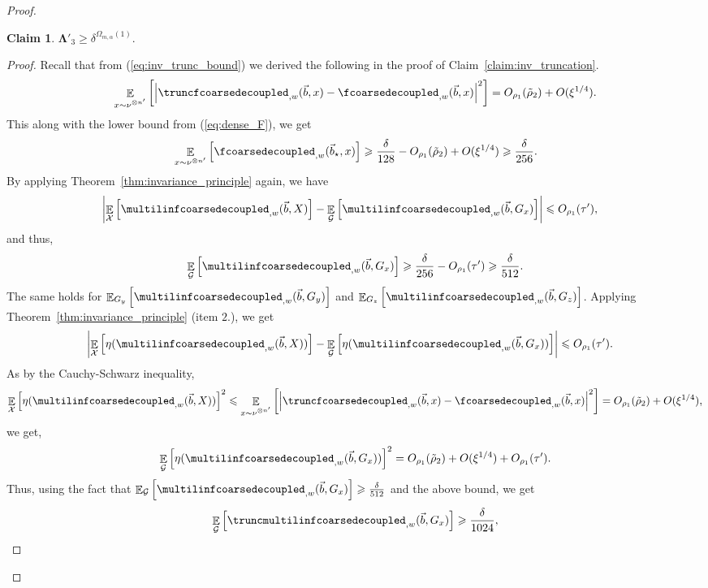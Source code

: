 \documentclass[11pt]{article}
\newtheorem{claim}[thm]{Claim}
\newcommand\card[1]{\left| {#1} \right|}
\newcommand\Expect[2]{{\mathop{\mathbb{E}}_{#1}\left[ {#2} \right]}}
\renewcommand\geq{\geqslant}
\renewcommand\leq{\leqslant}
\newcommand{\V}[1]{{#1}}
\begin{document}
\begin{proof}
   \begin{claim}\label{claim:inv_gaussian_lb} $\mathbf{\Lambda}'_3 \geq \delta^{\Omega_{m,\alpha}(1)}.$
   \end{claim}
   \begin{proof}
   Recall that from (\ref{eq:inv_trunc_bound}) we derived the following in the proof of Claim~\ref{claim:inv_truncation}.
       $$\Expect{\substack{\V x\sim \nu^{\otimes n'}}}{\card{\truncfcoarsedecoupled_{,\V w}(\vec{b},\V x) - \fcoarsedecoupled_{,\V w}(\vec{b},\V x) }^2} = O_{\rho_1}(\tilde{\rho}_2) + O(\xi^{1/4}).$$
       This along with the lower bound from (\ref{eq:dense_F}), we get
       $$\Expect{\V x\sim \nu^{\otimes n'}}{\fcoarsedecoupled_{,\V w}(\vec{b}_\star,\V x)  } \geq \frac{\delta}{128} -  O_{\rho_1}(\tilde{\rho}_2) + O(\xi^{1/4})\geq \frac{\delta}{256}.$$
 By applying Theorem~\ref{thm:invariance_principle} again, we have 
\begin{align*}
\card{\Expect{\mathcal{X}}{\multilinfcoarsedecoupled_{,\V w}(\vec{b}, X)} - \Expect{\mathcal{G}}{\multilinfcoarsedecoupled_{,\V w}(\vec{b},\V G_x)}} &\leq O_{\rho_1}(\tau'),
\end{align*}
and thus,
\begin{align*}
\Expect{\mathcal{G}}{\multilinfcoarsedecoupled_{,\V w}(\vec{b},\V G_x)}\geq \frac{\delta}{256} - O_{\rho_1}(\tau')\geq \frac{\delta}{512}.
\end{align*}
The same holds for $\Expect{G_y}{\multilinfcoarsedecoupled_{,\V w}(\vec{b},  \V G_y)}$ and $\Expect{G_z}{\multilinfcoarsedecoupled_{,\V w}(\vec{b}, \V G_z)}$. Applying Theorem~\ref{thm:invariance_principle} (item $2$.), we get
\begin{align*}
\card{\Expect{\mathcal{X}}{\eta(\multilinfcoarsedecoupled_{,\V w}(\vec{b}, X))} - \Expect{\mathcal{G}}{\eta(\multilinfcoarsedecoupled_{,\V w}(\vec{b},\V G_x))}} &\leq O_{\rho_1}(\tau').
\end{align*}
As by the Cauchy-Schwarz inequality,
$$\Expect{\mathcal{X}}{\eta(\multilinfcoarsedecoupled_{,\V w}(\vec{b}, X))}^2 \leq \Expect{\substack{\V x\sim \nu^{\otimes n'}}}{\card{\truncfcoarsedecoupled_{,\V w}(\vec{b},\V x) - \fcoarsedecoupled_{,\V w}(\vec{b},\V x) }^2} = O_{\rho_1}(\tilde{\rho}_2) + O(\xi^{1/4}),$$
we get,
\begin{equation}\label{eq:trunc_gauss_small}\Expect{\mathcal{G}}{\eta(\multilinfcoarsedecoupled_{,\V w}(\vec{b},\V G_x))}^2 = O_{\rho_1}(\tilde{\rho}_2) + O(\xi^{1/4}) + O_{\rho_1}(\tau').
\end{equation}
Thus, using the fact that $\Expect{\mathcal{G}}{\multilinfcoarsedecoupled_{,\V w}(\vec{b},\V G_x)}\geq  \frac{\delta}{512}$ and the above bound, we get
\begin{align*}
\Expect{\mathcal{G}}{\truncmultilinfcoarsedecoupled_{,\V w}(\vec{b},\V G_x)}\geq \frac{\delta}{1024},
\end{align*}


\end{proof}
\end{proof}
\end{document}
